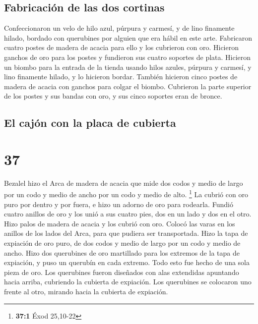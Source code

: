 \hypertarget{fabricaciuxf3n-de-las-dos-cortinas}{%
\subsection{Fabricación de las dos
cortinas}\label{fabricaciuxf3n-de-las-dos-cortinas}}

 Confeccionaron un velo de hilo azul, púrpura y carmesí,
y de lino finamente hilado, bordado con querubines por alguien que era
hábil en este arte.  Fabricaron cuatro postes de madera
de acacia para ello y los cubrieron con oro. Hicieron ganchos de oro
para los postes y fundieron sus cuatro soportes de plata.
 Hicieron un biombo para la entrada de la tienda usando
hilos azules, púrpura y carmesí, y lino finamente hilado, y lo hicieron
bordar.  También hicieron cinco postes de madera de
acacia con ganchos para colgar el biombo. Cubrieron la parte superior de
los postes y sus bandas con oro, y sus cinco soportes eran de bronce.

\hypertarget{el-cajuxf3n-con-la-placa-de-cubierta}{%
\subsection{El cajón con la placa de
cubierta}\label{el-cajuxf3n-con-la-placa-de-cubierta}}

\hypertarget{section-36}{%
\section{37}\label{section-36}}

 Bezalel hizo el Arca de madera de acacia que mide dos
codos y medio de largo por un codo y medio de ancho por un codo y medio
de alto. \footnote{\textbf{37:1} Éxod 25,10-22}  La cubrió
con oro puro por dentro y por fuera, e hizo un adorno de oro para
rodearla.  Fundió cuatro anillos de oro y los unió a sus
cuatro pies, dos en un lado y dos en el otro.  Hizo palos
de madera de acacia y los cubrió con oro.  Colocó las
varas en los anillos de los lados del Arca, para que pudiera ser
transportada.  Hizo la tapa de expiación de oro puro, de
dos codos y medio de largo por un codo y medio de ancho. 
Hizo dos querubines de oro martillado para los extremos de la tapa de
expiación,  y puso un querubín en cada extremo. Todo esto
fue hecho de una sola pieza de oro.  Los querubines fueron
diseñados con alas extendidas apuntando hacia arriba, cubriendo la
cubierta de expiación. Los querubines se colocaron uno frente al otro,
mirando hacia la cubierta de expiación.

